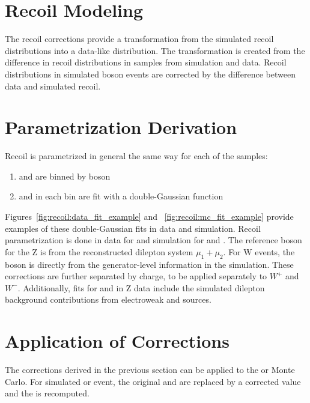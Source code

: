 
\section{Recoil Modeling} \label{ch:recoil:modeling}
The recoil corrections provide a transformation from the simulated recoil distributions into a data-like distribution. The transformation is created from the difference in recoil distributions in \zll samples from simulation and data. Recoil distributions in simulated \W boson events are corrected by the difference between data and simulated \zll recoil.

\section{Parametrization Derivation}
Recoil is parametrized in general the same way for each of the samples:
\begin{enumerate}
\item \upar and \uprp are binned by boson \pt
\item \upar and \uprp  in each \pt bin are fit with a double-Gaussian function
\end{enumerate}
Figures~\ref{fig:recoil:data_fit_example}
 and ~\ref{fig:recoil:mc_fit_example} provide examples of these double-Gaussian fits in data and simulation. Recoil parametrization is done in data for \zmm and simulation for \zmm and \wmunu. The reference boson \pt for the Z is from the reconstructed dilepton system $\mu_1+\mu_2$. For W events, the boson \pt is directly   from the generator-level information in the simulation. These corrections are further separated by charge, to be applied separately to $W^+$ and $W^-$.
Additionally, fits for \upar and \uprp in Z data include the simulated dilepton background contributions from electroweak and \ttbar sources.





\section{Application of Corrections}\label{ch:recoil:apply}
The corrections derived in the previous section can be applied to the \W or \Z Monte Carlo. For simulated \W or \Z event, the original \upar and \uprp are replaced by a corrected value and the \met is recomputed. 
